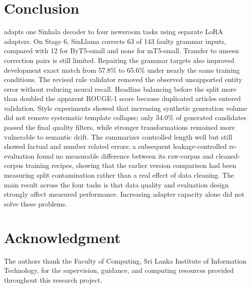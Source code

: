 \documentclass[a4paper,conference]{IEEEtran}
\newif\ificacblind
\begin{document}
\section{Conclusion}
\systemname{} adapts one Sinhala decoder to four newsroom tasks using separate LoRA
adapters. On Stage 6, SinLlama corrects 63 of 143 faulty grammar inputs, compared
with 12 for ByT5-small and none for mT5-small. Transfer to unseen correction
pairs is still limited. Repairing the grammar targets also improved development
exact match from 57.8\% to 65.6\% under nearly the same training conditions.
The revised rule validator removed the observed unsupported entity error without
reducing neural recall. Headline balancing before the split more than doubled
the apparent ROUGE-1 score because duplicated articles entered validation. Style experiments showed that increasing synthetic generation volume did not
remove systematic template collapse; only 34.0\% of generated candidates
passed the final quality filters, while stronger transformations remained more
vulnerable to semantic drift. The summarizer controlled length well but still
showed factual and number related errors; a subsequent leakage-controlled
re-evaluation found no measurable difference between its raw-corpus and
cleaned-corpus training recipes, showing that the earlier version comparison
had been measuring split contamination rather than a real effect of data
cleaning. The
main result across the four tasks is that data quality and evaluation design
strongly affect measured performance. Increasing adapter capacity alone did
not solve these problems.

\ificacblind
\else
\section*{Acknowledgment}
The authors thank the Faculty of Computing, Sri Lanka Institute of Information
Technology, for the supervision, guidance, and computing resources provided
throughout this research project.
\fi
\end{document}
